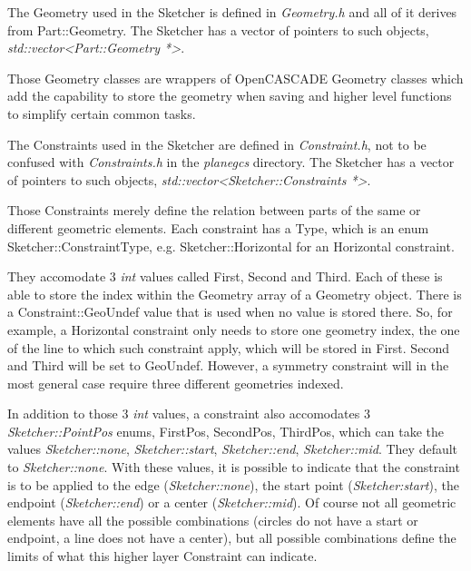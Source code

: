 \documentclass[12pt,twoside,a4paper]{book}
\newenvironment{tolerant}[1]{%
  \par\tolerance=#1\relax
}{%
  \par
}
\begin{document}
    \begin{tolerant}{500}
    The Geometry used in the Sketcher is defined in \emph{Geometry.h} and all of it derives from Part::Geometry. The Sketcher has a vector of pointers to such objects, \emph{std::vector\textless Part::Geometry *\textgreater}.

    Those Geometry classes are wrappers of OpenCASCADE Geometry classes which add the capability to store the geometry when saving and higher level functions to simplify certain common tasks.

    The Constraints used in the Sketcher are defined in \emph{Constraint.h}, not to be confused with \emph{Constraints.h} in the \emph{planegcs} directory. The Sketcher has a vector of pointers to such objects, \emph{std::vector\textless Sketcher::Constraints *\textgreater}.

    Those Constraints merely define the relation between parts of the same or different geometric elements. Each constraint has a Type, which is an enum Sketcher::ConstraintType, e.g. Sketcher::Horizontal for an Horizontal constraint.

    They accomodate 3 \emph{int} values called First, Second and Third. Each of these is able to store the index within the Geometry array of a Geometry object. There is a Constraint::GeoUndef value that is used when no value is stored there. So, for example, a Horizontal constraint only needs to store one geometry index, the one of the line to which such constraint apply, which will be stored in First. Second and Third will be set to GeoUndef. However, a symmetry constraint will in the most general case require three different geometries indexed.

    In addition to those 3 \emph{int} values, a constraint also accomodates 3 \emph{Sketcher::PointPos} enums, FirstPos, SecondPos, ThirdPos, which can take the values \emph{Sketcher::none}, \emph{Sketcher::start}, \emph{Sketcher::end}, \emph{Sketcher::mid}. They default to \emph{Sketcher::none}. With these values, it is possible to indicate that the constraint is to be applied to the edge (\emph{Sketcher::none}), the start point (\emph{Sketcher:start}), the endpoint (\emph{Sketcher::end}) or a center (\emph{Sketcher::mid}). Of course not all geometric elements have all the possible combinations (circles do not have a start or endpoint, a line does not have a center), but all possible combinations define the limits of what this higher layer Constraint can indicate.


\end{tolerant}
\end{document}
